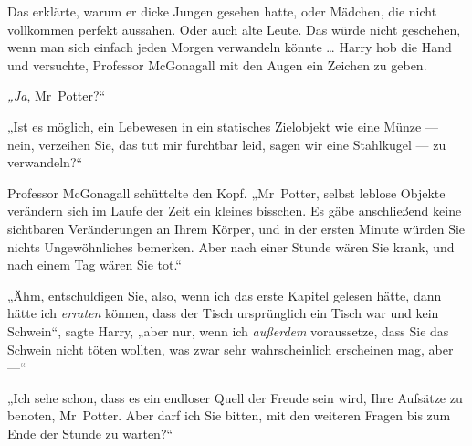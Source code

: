 Das erklärte, warum er dicke Jungen gesehen hatte, oder Mädchen, die nicht vollkommen perfekt aussahen. Oder auch alte Leute. Das würde nicht geschehen, wenn man sich einfach jeden Morgen verwandeln könnte … Harry hob die Hand und versuchte, Professor McGonagall mit den Augen ein Zeichen zu geben.

\emph{„Ja}, Mr~Potter?“

„Ist es möglich, ein Lebewesen in ein statisches Zielobjekt wie eine Münze — nein, verzeihen Sie, das tut mir furchtbar leid, sagen wir eine Stahlkugel — zu verwandeln?“

Professor McGonagall schüttelte den Kopf.
„Mr~Potter, selbst leblose Objekte verändern sich im Laufe der Zeit ein kleines bisschen. Es gäbe anschließend keine sichtbaren Veränderungen an Ihrem Körper, und in der ersten Minute würden Sie nichts Ungewöhnliches bemerken. Aber nach einer Stunde wären Sie krank, und nach einem Tag wären Sie tot.“

„Ähm, entschuldigen Sie, also, wenn ich das erste Kapitel gelesen hätte, dann hätte ich \emph{erraten} können, dass der Tisch ursprünglich ein Tisch war und kein Schwein“, sagte Harry, „aber nur, wenn ich \emph{außerdem} voraussetze, dass Sie das Schwein nicht töten wollten, was zwar sehr wahrscheinlich erscheinen mag, aber —“

„Ich sehe schon, dass es ein endloser Quell der Freude sein wird, Ihre Aufsätze zu benoten, Mr~Potter. Aber darf ich Sie bitten, mit den weiteren Fragen bis zum Ende der Stunde zu warten?“

